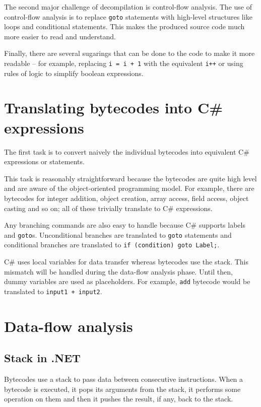 \documentclass[12pt,twoside,notitlepage]{report}
\begin{document}
The second major challenge of decompilation is control-flow 
analysis.  The use of control-flow analysis
is to replace \verb|goto| statements with high-level structures 
like loops and conditional statements.  This makes the produced 
source code much more easier to read and understand.

Finally, there are several sugarings that can be done to the code to
make it more readable -- for example, replacing \verb|i = i + 1| 
with the equivalent \verb|i++| or using rules of logic to 
simplify boolean expressions.

\section{Translating bytecodes into C\# expressions}

The first task is to convert naively the individual bytecodes into 
equivalent C\# expressions or statements.

This task is reasonably straightforward because the bytecodes 
are quite high level and are aware of the object-oriented
programming model.  For example, there are bytecodes
for integer addition, object creation, array access,
field access, object casting and so on; all of these trivially
translate to C\# expressions.

Any branching commands are also easy to handle because
C\# supports labels and \verb|goto|s.  Unconditional branches
are translated to \verb|goto| statements and conditional 
branches are translated to \verb|if (condition) goto Label;|.

C\# uses local variables for data transfer whereas bytecodes
use the stack.  This mismatch will be handled during the
data-flow analysis phase.  Until then, dummy variables
are used as placeholders.  For example, \verb|add| bytecode
would be translated to \verb|input1 + input2|.


\section{Data-flow analysis}
\subsection{Stack in .NET}

Bytecodes use a stack to pass data between consecutive 
instructions.  When a bytecode is executed, it pops its arguments
from the stack, it performs some operation on them and then
it pushes the result, if any, back to the stack.
\end{document}
